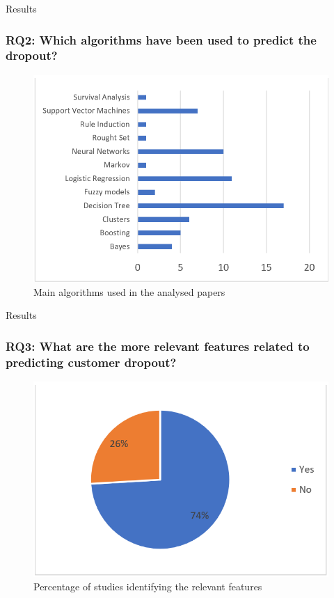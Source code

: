 \documentclass[10pt]{beamer}
\begin{document}
\begin{frame}[fragile]{Results}
	\frametitle{RQ2: Which algorithms have been used to predict the dropout?}
	\begin{figure}
		\includegraphics[scale=0.5]{../img/mainAlgorithms.png}
		\caption{Main algorithms used in the analysed papers}
		\label{figure3}
	\end{figure}
\end{frame}

\begin{frame}[fragile]{Results}
	\frametitle{RQ3: What are the more relevant features related to predicting customer dropout?}
	\begin{figure}
		\includegraphics[scale=0.5]{../img/relevantFeatures.png}
		\caption{Percentage of studies identifying the relevant features}
		\label{figure4}
	\end{figure}
\end{frame}
\end{document}
